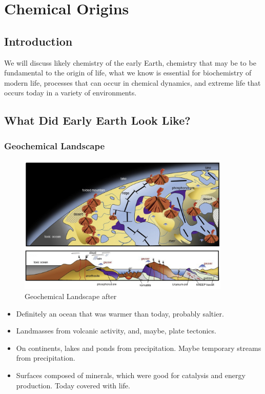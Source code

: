 \documentclass[]{article}
\begin{document}
\section{Chemical Origins}
\subsection{Introduction}

We will discuss likely chemistry of the early Earth, chemistry that may be to be fundamental to the origin of life, what we know is essential for biochemistry of modern life, processes that can occur in chemical dynamics, and extreme life that occurs today in a variety of environments.


\subsection{What Did Early Earth Look Like?}

\subsubsection{Geochemical Landscape}
\begin{figure}[h!]
	\caption{Geochemical Landscape after \cite{kitadai2018origins}}
	\includegraphics[width=0.9\textwidth]{GeochemicalLandscape}
\end{figure}

  
  \begin{itemize}
  	\item  Definitely an ocean that was warmer than today, probably saltier.
  	\item Landmasses from volcanic activity, and, maybe, plate tectonics.
  	\item On continents, lakes and ponds from precipitation.  Maybe temporary streams from precipitation.
  	\item Surfaces composed of minerals, which were good for catalysis and energy production. Today covered with life.
  \end{itemize}
\end{document}
